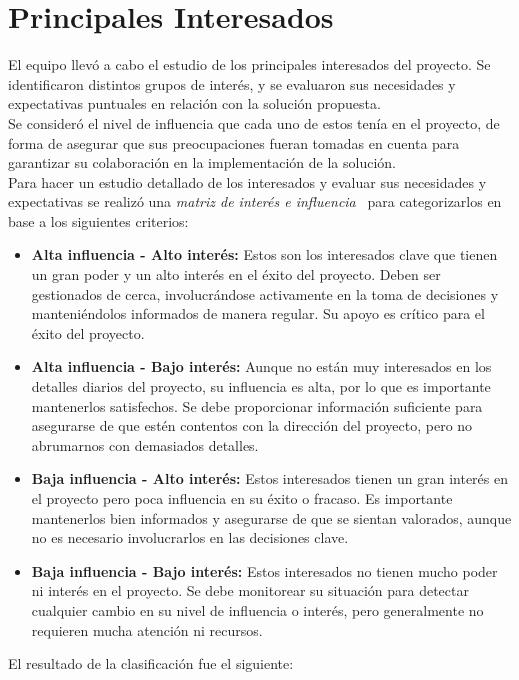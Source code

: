 \section{Principales Interesados}\label{sec:pricipalesInteresados}

El equipo llevó a cabo el estudio de los principales interesados del proyecto. Se identificaron distintos grupos de interés, 
y se evaluaron sus necesidades y expectativas puntuales en relación con la solución propuesta.\\
Se consideró el nivel de influencia que cada uno de estos tenía en el proyecto, de forma de asegurar que sus preocupaciones fueran 
tomadas en cuenta para garantizar su colaboración en la implementación de la solución.\\
Para hacer un estudio detallado de los interesados y evaluar sus necesidades y expectativas se realizó una \textit{matriz de interés e influencia}~\cite{projectmanagement_stakeholder_analysis} 
para categorizarlos en base a los siguientes criterios:


\begin{itemize}
    \item \textbf{Alta influencia -  Alto interés:} Estos son los interesados clave que tienen un gran poder y un alto interés en el 
    éxito del proyecto. Deben ser gestionados de cerca, involucrándose activamente en la toma de decisiones y manteniéndolos informados 
    de manera regular. Su apoyo es crítico para el éxito del proyecto.
    \item \textbf{Alta influencia - Bajo interés:} Aunque no están muy interesados en los detalles diarios del proyecto, su influencia es 
    alta, por lo que es importante mantenerlos satisfechos. Se debe proporcionar información suficiente para asegurarse de que estén 
    contentos con la dirección del proyecto, pero no abrumarnos con demasiados detalles.
    \item \textbf{Baja influencia - Alto interés:} Estos interesados tienen un gran interés en el proyecto pero poca influencia en su éxito 
    o fracaso. Es importante mantenerlos bien informados y asegurarse de que se sientan valorados, aunque no es necesario involucrarlos en 
    las decisiones clave.
    \item \textbf{Baja influencia - Bajo interés:} Estos interesados no tienen mucho poder ni interés en el proyecto. Se debe monitorear su 
    situación para detectar cualquier cambio en su nivel de influencia o interés, pero generalmente no requieren mucha atención ni recursos.
\end{itemize}

El resultado de la clasificación fue el siguiente:


